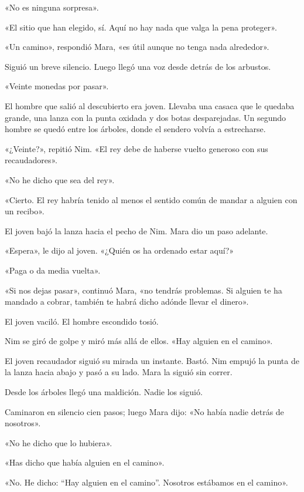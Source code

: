 \documentclass[10pt,a4paper]{article}
\begin{document}
«No es ninguna sorpresa».

«El sitio que han elegido, sí. Aquí no hay nada que valga la pena proteger».

«Un camino», respondió Mara, «es útil aunque no tenga nada alrededor».

Siguió un breve silencio. Luego llegó una voz desde detrás de los arbustos.

«Veinte monedas por pasar».

El hombre que salió al descubierto era joven. Llevaba una casaca que le quedaba grande, una lanza con la punta oxidada y dos botas desparejadas. Un segundo hombre se quedó entre los árboles, donde el sendero volvía a estrecharse.

«¿Veinte?», repitió Nim. «El rey debe de haberse vuelto generoso con sus recaudadores».

«No he dicho que sea del rey».

«Cierto. El rey habría tenido al menos el sentido común de mandar a alguien con un recibo».

El joven bajó la lanza hacia el pecho de Nim. Mara dio un paso adelante.

«Espera», le dijo al joven. «¿Quién os ha ordenado estar aquí?»

«Paga o da media vuelta».

«Si nos dejas pasar», continuó Mara, «no tendrás problemas. Si alguien te ha mandado a cobrar, también te habrá dicho adónde llevar el dinero».

El joven vaciló. El hombre escondido tosió.

Nim se giró de golpe y miró más allá de ellos. «Hay alguien en el camino».

El joven recaudador siguió su mirada un instante. Bastó. Nim empujó la punta de la lanza hacia abajo y pasó a su lado. Mara la siguió sin correr.

Desde los árboles llegó una maldición. Nadie los siguió.

Caminaron en silencio cien pasos; luego Mara dijo: «No había nadie detrás de nosotros».

«No he dicho que lo hubiera».

«Has dicho que había alguien en el camino».

«No. He dicho: “Hay alguien en el camino”. Nosotros estábamos en el camino».
\end{document}
